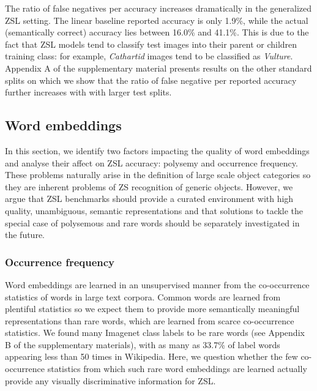 The ratio of false negatives per accuracy increases dramatically in the generalized ZSL setting.
The linear baseline reported accuracy is only 1.9\%, while the actual (semantically correct) accuracy lies between 16.0\% and 41.1\%.
This is due to the fact that ZSL models tend to classify test images into their parent or children training class:
for example, \textit{Cathartid} images tend to be classified as \textit{Vulture}.
Appendix A of the supplementary material presents results on the other standard splits 
on which we show that the ratio of false negative per reported accuracy further increases with with larger test splits.

\subsection{Word embeddings}

In this section, we identify two factors impacting the quality of word embeddings 
and analyse their affect on ZSL accuracy: polysemy and occurrence frequency.
These problems naturally arise in the definition of large scale object categories
so they are inherent problems of ZS recognition of generic objects.
However, we argue that ZSL benchmarks should provide a curated environment with high quality, unambiguous, semantic representations
and that solutions to tackle the special case of polysemous and rare words should 
be separately investigated in the future.

\subsubsection{Occurrence frequency}

Word embeddings are learned in an unsupervised manner from the co-occurrence statistics of words in large text corpora.
Common words are learned from plentiful statistics so we expect them to provide more semantically meaningful representations than rare words, 
which are learned from scarce co-occurrence statistics.
We found many Imagenet class labels to be rare words (see Appendix B of the supplementary materials), with as many as 33.7\% of label words appearing less than 50 times in Wikipedia. 
Here, we question whether the few co-occurrence statistics from which such rare word embeddings are learned actually provide any visually discriminative information for ZSL.


